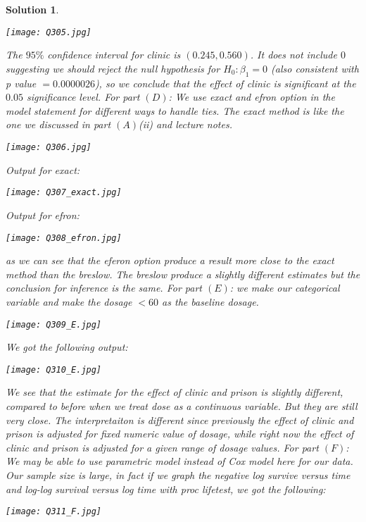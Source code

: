 \documentclass[11pt]{article}
\newtheorem{sol}{Solution}
\begin{document}
\begin{sol}
\begin{center}
		\texttt{[image: Q305.jpg]}
	\end{center}
	The $95\%$ confidence interval for clinic is $(0.245, 0.560)$. It does not include $0$ suggesting we should reject the null hypothesis for $H_0: \beta_1 = 0$ (also consistent with p value $= 0.0000026$), so we conclude that the effect of clinic is significant at the $0.05$ significance level.\vskip 2mm
	For part $(D)$:\vskip 2mm
	We use exact and efron option in the model statement for different ways to handle ties. The exact method is like the one we discussed in part $(A)$(ii) and lecture notes.
	\begin{center}
		\texttt{[image: Q306.jpg]}
	\end{center}
	Output for exact:
	\begin{center}
		\texttt{[image: Q307\_exact.jpg]}
	\end{center}
	Output for efron:
	\begin{center}
		\texttt{[image: Q308\_efron.jpg]}
	\end{center}
	as we can see that the eferon option produce a result more close to the exact method than the breslow. The breslow produce a slightly different estimates but the conclusion for inference is the same.\vskip 2mm
	For part $(E)$:\vskip 2mm
	we make our categorical variable and make the dosage $<60$ as the baseline dosage.
	\begin{center}
		\texttt{[image: Q309\_E.jpg]}
	\end{center}
	We got the following output:
	\begin{center}
		\texttt{[image: Q310\_E.jpg]}
	\end{center}
	We see that the estimate for the effect of clinic and prison is slightly different, compared to before when we treat dose as a continuous variable. But they are still very close. The interpretaiton is different since previously the effect of clinic and prison is adjusted for fixed numeric value of dosage, while right now the effect of clinic and prison is adjusted for a given range of dosage values.\vskip 2mm
	For part $(F)$:\vskip 2mm
	We may be able to use parametric model instead of Cox model here for our data. Our sample size is large, in fact if we graph the negative log survive versus time and log-log survival versus log time with proc lifetest, we got the following:
	\begin{center}
		\texttt{[image: Q311\_F.jpg]}
	\end{center}

\end{sol}
\end{document}
